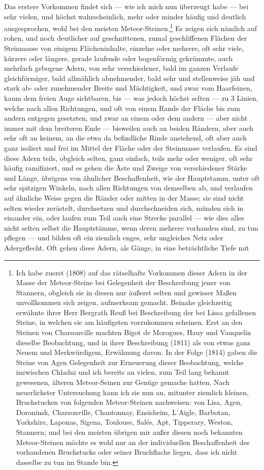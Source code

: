 \documentclass[a4paper, 11pt, oneside, german]{article}
\begin{document}
Das erstere Vorkommen findet sich --- wie ich mich nun überzeugt habe --- bei sehr vielen, und höchst wahrscheinlich, mehr oder minder häufig und deutlich ausgesprochen, wohl bei den meisten Meteor-Steinen.\footnote{Ich habe zuerst (1808) auf das rätselhafte Vorkommen dieser Adern in der Masse der Meteor-Steine bei Gelegenheit der Beschreibung jener von Stannern, obgleich sie in diesen nur äußerst selten und gewisser Maßen unvollkommen sich zeigen, aufmerksam gemacht. Beinahe gleichzeitig erwähnte ihrer Herr Bergrath Reuß bei Beschreibung der bei Lissa gefallenen Steine, in welchen sie am häufigsten vorzukommen scheinen. Erst an den Steinen von Charsonville machten Bigot de Morogues, Hauy und Vauquelin dieselbe Beobachtung, und in ihrer Beschreibung (1811) als von etwas ganz Neuem und Merkwürdigem, Erwähnung davon. In der Folge (1814) gaben die Steine von Agen Gelegenheit zur Erneuerung dieser Beobachtung, welche inzwischen Chladni und ich bereits an vielen, zum Teil lang bekannt gewesenen, älteren Meteor-Seinen zur Genüge gemache hatten. Nach neuerlichster Untersuchung kann ich sie nun an, mitunter ziemlich kleinen, Bruchstucken von folgenden Meteor-Steinen nachweisen: von Lisa, Agen, Doroninsk, Charsonville, Chantonnay, Ensisheim, L'Aigle, Barbotan, Yorkshire, Laponas, Sigena, Toulouse, Salés, Apt, Tipperary, Weston, Stannern; und bei den meisten übrigen mir außer diesen noch bekannten Meteor-Steinen möchte es wohl nur an der individuellen Beschaffenheit des vorhandenen Bruchstucks oder seiner Bruchflache liegen, dass ich nicht dasselbe zu tun im Stande bin.} Es zeigen sich nämlich auf rohen, und noch deutlicher auf geschnittenen, zumal geschliffenen Flächen der Steinmasse von einigem Flächeninhalte, einzelne oder mehrere, oft sehr viele, kürzere oder längere, gerade laufende oder bogenförmig gekrümmte, auch mehrfach gebogene Adern, von sehr verschiedener, bald im ganzen Verlaufe gleichförmiger, bald allmählich abnehmender, bald sehr und stellenweise jäh und stark ab- oder zunehmender Breite und Mächtigkeit, und zwar vom Haarfeinen, kaum dem freien Auge sichtbaren, bis --- was jedoch höchst selten --- zu 3 Linien, welche nach allen Richtungen, und oft von einem Rande der Fläche bis zum andern entgegen gesetzten, und zwar an einem oder dem andern --- aber nicht immer mit dem breiteren Ende --- bisweilen auch an beiden Rändern, aber auch sehr oft an keinem, an die etwa da befindliche Rinde anstehend, oft aber auch ganz isoliert und frei im Mittel der Fläche oder der Steinmasse verlaufen. Es sind diese Adern teils, obgleich selten, ganz einfach, teils mehr oder weniger, oft sehr häufig ramifiziert, und es gehen die Äste und Zweige von verschiedener Stärke und Länge, übrigens von ähnlicher Beschaffenheit, wie der Hauptstamm, unter oft sehr spitzigen Winkeln, nach allen Richtungen von demselben ab, und verlaufen auf ähnliche Weise gegen die Ränder oder mitten in der Masse; sie sind nicht selten wieder zerästelt, durchsetzen und durchschneiden sich, münden sich in einander ein, oder laufen zum Teil auch eine Strecke parallel --- wie dies alles nicht selten selbst die Hauptstämme, wenn deren mehrere vorhanden sind, zu tun pflegen --- und bilden oft ein ziemlich enges, sehr ungleiches Netz oder Adergeflecht. Oft gehen diese Adern, als Gänge, in eine beträchtliche Tiefe mit 
\end{document}
